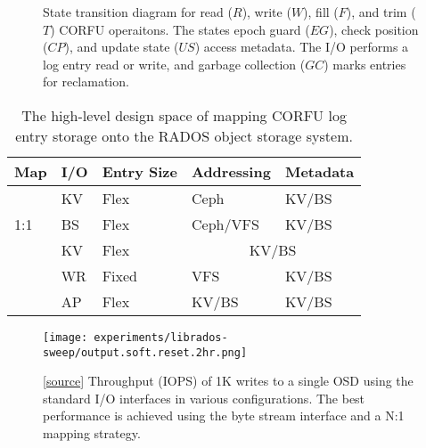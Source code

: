 \documentclass[10pt,twocolumn]{article}
\begin{document}
\begin{figure}
\centering
{}
\caption{State transition diagram for read ($R$), write ($W$), fill ($F$), and
trim ($T$) CORFU operaitons. The states epoch guard ($EG$), check position ($CP$),
and update state ($US$) access metadata. The I/O performs a log entry read or
write, and garbage collection ($GC$) marks entries for reclamation.}
\end{figure}


\begin{table}
\begin{tabular}{ | l | l | l | l | l |}
\hline
Map & I/O & Entry Size & Addressing & Metadata \\ \hline
\multirow{3}{*}{1:1} & KV  & Flex     & Ceph      & KV/BS \\ \cline{2-5}
                     & BS  & Flex     & Ceph/VFS  & KV/BS \\ \hline
\multirow{4}{*}{N:1} & KV  & Flex     & \multicolumn{2}{|c|}{KV/BS} \\ \cline{2-5}
                     & WR  & Fixed    & VFS       & KV/BS \\ \cline{2-5}
                     & AP  & Flex     & KV/BS     & KV/BS \\
\hline
\end{tabular}
\caption{The high-level design space of mapping CORFU log entry storage onto
the RADOS object storage system.}
\label{t:init-ds}
\end{table}

\begin{figure}[h]
  \centering
  \texttt{[image: experiments/librados-sweep/output.soft.reset.2hr.png]}
  \caption{
[\href{https://github.com/noahdesu/zlog-popper/tree/master/experiments/librados-sweep/visualize.ipynb}{source}]
Throughput (IOPS) of 1K writes to a single OSD using the standard I/O
interfaces in various configurations. The best performance is achieved using
the byte stream interface and a N:1 mapping strategy.
}
\end{figure}
\end{document}
